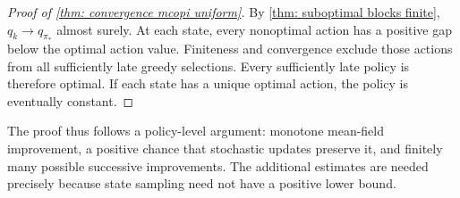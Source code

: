 \begin{proof}[Proof of \autoref{thm: convergence mcopi uniform}]
By \autoref{thm: suboptimal blocks finite}, $q_k\to q_{\pi_*}$ almost surely. At each state, every nonoptimal action has a positive gap below the optimal action value. Finiteness and convergence exclude those actions from all sufficiently late greedy selections. Every sufficiently late policy is therefore optimal. If each state has a unique optimal action, the policy is eventually constant.
\end{proof}

The proof thus follows a policy-level argument: monotone mean-field improvement, a positive chance that stochastic updates preserve it, and finitely many possible successive improvements. The additional estimates are needed precisely because state sampling need not have a positive lower bound.
